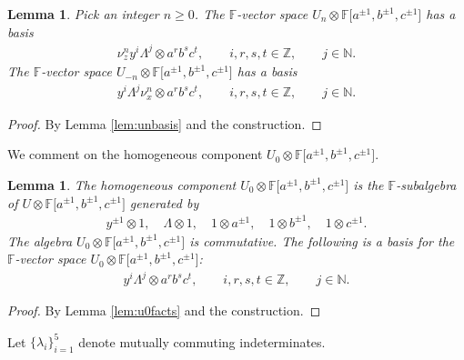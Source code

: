 \documentclass[11pt]{article}
\numberwithin{equation}{section}
\newtheorem{Lemma}[Theorem]{Lemma}
\begin{document}
\begin{Lemma}
\label{lem:gradingbasis}
Pick an integer $n\geq 0$. The $\mathbb F$-vector space
$U_n \otimes
\mathbb F \lbrack a^{\pm 1}, b^{\pm 1}, c^{\pm 1}\rbrack $ has
a basis
\begin{gather*}
\nu^n_z y^i \Lambda^j
\otimes a^rb^sc^t,
 \qquad i,r,s,t\in \mathbb Z, \qquad j\in \mathbb N.
\end{gather*}
The $\mathbb F$-vector space $U_{-n} \otimes {\mathbb F}\lbrack a^{\pm 1}, b^{\pm 1}, c^{\pm 1} \rbrack$ has a basis
\begin{gather*}
y^i \Lambda^j \nu^n_x
\otimes a^rb^sc^t,
 \qquad i,r,s,t\in \mathbb Z,  \qquad j\in \mathbb N.
\end{gather*}
\end{Lemma}
\begin{proof}
By Lemma
\ref{lem:unbasis}
and the construction.
\end{proof}

We comment on the homogeneous component
$U_0 \otimes
\mathbb F \lbrack a^{\pm 1}, b^{\pm 1}, c^{\pm 1}\rbrack $.

\begin{Lemma}
\label{lem:u0tensor}
The homogeneous component
$U_0 \otimes
\mathbb F \lbrack a^{\pm 1}, b^{\pm 1}, c^{\pm 1}\rbrack $
is the $\mathbb F$-subalgebra of
$
U
\otimes
\mathbb F \lbrack a^{\pm 1}, b^{\pm 1}, c^{\pm 1}\rbrack $
generated by
\begin{gather*}
y^{\pm 1}\otimes 1,\quad
\Lambda \otimes 1, \quad
1\otimes a^{\pm 1},
\quad
1\otimes b^{\pm 1},
\quad
1\otimes c^{\pm 1}.
\end{gather*}
The algebra
$U_0 \otimes
\mathbb F \lbrack a^{\pm 1}, b^{\pm 1}, c^{\pm 1}\rbrack $
is commutative.
The following is a basis for the
$\mathbb F$-vector space
$U_0 \otimes
\mathbb F \lbrack a^{\pm 1}, b^{\pm 1}, c^{\pm 1}\rbrack $:
\begin{gather*}
y^i \Lambda^j\otimes a^r b^s c^t, \qquad i,r,s,t\in \mathbb Z, \qquad j\in \mathbb N.
\end{gather*}
\end{Lemma}
\begin{proof}
By Lemma
\ref{lem:u0facts} and the construction.
\end{proof}

 Let $\lbrace \lambda_i\rbrace_{i=1}^5 $ denote mutually
commuting indeterminates.
\end{document}
